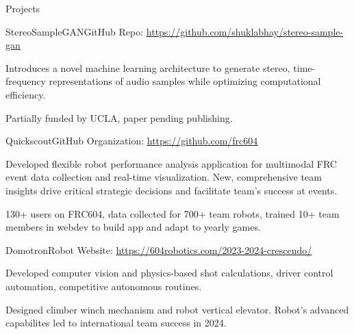\documentclass[
  10pt, %
]{resume} %
\begin{document}

\begin{rSection}{Projects}

  
  \begin{rSubsection}{StereoSampleGAN}{}{GitHub Repo: \underline{\href{https://github.com/shuklabhay/stereo-sample-gan}{https://github.com/shuklabhay/stereo-sample-gan}}}{}
       
    \item Introduces a novel machine learning architecture to generate stereo, time-frequency representations of audio samples while optimizing computational efficiency.
        
    \item Partially funded by UCLA, paper pending publishing.
        
  \end{rSubsection}
      
  \begin{rSubsection}{Quickscout}{}{GitHub Organization: \underline{\href{https://github.com/frc604}{https://github.com/frc604}}}{}
       
    \item Developed flexible robot performance analysis application for multimodal FRC event data collection and real-time visualization. New, comprehensive team insights drive critical strategic decisions and facilitate team's success at events.
        
    \item 130+ users on FRC604, data collected for 700+ team robots, trained 10+ team members in webdev to build app and adapt to yearly games.
        
  \end{rSubsection}
      
  \begin{rSubsection}{Domotron}{}{Robot Website: \underline{\href{https://604robotics.com/2023-2024-crescendo/}{https://604robotics.com/2023-2024-crescendo/}}}{}
       
    \item Developed computer vision and physics-based shot calculations, driver control automation, competitive autonomous routines.
        
    \item Designed climber winch mechanism and robot vertical elevator. Robot's advanced capabilites led to international team success in 2024.
        

\end{rSubsection}
\end{rSection}
\end{document}
